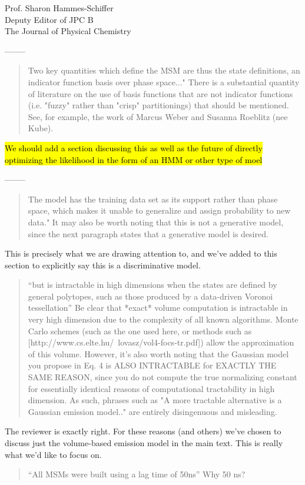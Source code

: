 \documentclass{letter}
\newcommand{\separate}{\begin{center}--------\end{center}}
\begin{document}
\begin{letter}{Prof. Sharon Hammes-Schiffer \\ Deputy Editor of JPC B \\ The Journal of Physical Chemistry}
\separate
\begin{quote}
Two key quantities which define the MSM are thus the state definitions, an indicator function basis over phase space..."  There is a substantial quantity of literature on the use of basis functions that are not indicator functions (i.e. "fuzzy" rather than "crisp" partitionings) that should be mentioned.  See, for example, the work of Marcus Weber and Susanna Roeblitz (nee Kube).
\end{quote}

\hl{We should add a section discussing this as well as the future of directly optimizing the likelihood in the form of an HMM or other type of moel}

\separate
\begin{quote}
The model has the training data set as its support rather than phase space, which makes it unable to generalize and assign probability to new data."  It may also be worth noting that this is not a generative model, since the next paragraph states that a generative model is desired.
\end{quote}

This is precisely what we are drawing attention to, and we've added to this section to explicitly say this is a discriminative model.

\begin{quote}
``but is intractable in high dimensions when the states are defined by general polytopes, such as those produced by a data-driven Voronoi tessellation''  Be clear that *exact* volume computation is intractable in very high dimension due to the complexity of all known algorithms.  Monte Carlo schemes (such as the one used here, or methods such as [http://www.cs.elte.hu/~lovasz/vol4-focs-tr.pdf]) allow the approximation of this volume.  However, it's also worth noting that the Gaussian model you propose in Eq. 4 is ALSO INTRACTABLE for EXACTLY THE SAME REASON, since you do not compute the true normalizing constant for essentially identical reasons of computational tractability in high dimension.  As such, phrases such as "A more tractable alternative is a Gaussian emission model.." are entirely disingenuous and misleading.
\end{quote}

The reviewer is exactly right. For these reasons (and others) we've chosen to discuss just the volume-based emission model in the main text. This is really what we'd like to focus on.

\begin{quote}
``All MSMs were built using a lag time of 50ns''  Why 50 ns?
\end{quote}


\end{letter}
\end{document}
